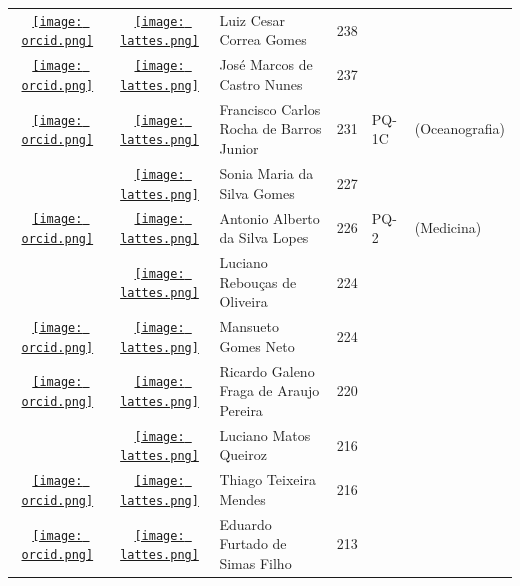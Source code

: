 \documentclass[12pt,brazil]{article}\usepackage[]{graphicx}\usepackage[]{xcolor}
\begin{document}
\begin{longtable}{cclrll}
\href{https://orcid.org/0000-0002-3171-9988}{\texttt{[image: orcid.png]}} & \href{http://lattes.cnpq.br/9902635897527204}{\texttt{[image: lattes.png]}} & Luiz Cesar Correa Gomes & 238 &  &  \\

\href{https://orcid.org/0000-0001-7142-5995}{\texttt{[image: orcid.png]}} & \href{http://lattes.cnpq.br/5553350296562020}{\texttt{[image: lattes.png]}} & José Marcos de Castro Nunes & 237 &  &  \\

\href{https://orcid.org/0000-0002-3037-1991}{\texttt{[image: orcid.png]}} & \href{http://lattes.cnpq.br/1085274416109765}{\texttt{[image: lattes.png]}} & Francisco Carlos Rocha de Barros Junior & 231 & PQ-1C & (Oceanografia) \\

 & \href{http://lattes.cnpq.br/3105186524832213}{\texttt{[image: lattes.png]}} & Sonia Maria da Silva Gomes & 227 &  &  \\

\href{https://orcid.org/0000-0002-7875-8212}{\texttt{[image: orcid.png]}} & \href{http://lattes.cnpq.br/4683004949201653}{\texttt{[image: lattes.png]}} & Antonio Alberto da Silva Lopes & 226 & PQ-2 & (Medicina) \\

 & \href{http://lattes.cnpq.br/0372650483087124}{\texttt{[image: lattes.png]}} & Luciano Rebouças de Oliveira & 224 &  &  \\

\href{https://orcid.org/0000-0002-0717-9694}{\texttt{[image: orcid.png]}} & \href{http://lattes.cnpq.br/1725940502832756}{\texttt{[image: lattes.png]}} & Mansueto Gomes Neto & 224 &  &  \\

\href{https://orcid.org/0000-0003-3913-3735}{\texttt{[image: orcid.png]}} & \href{http://lattes.cnpq.br/1786940828895467}{\texttt{[image: lattes.png]}} & Ricardo Galeno Fraga de Araujo Pereira & 220 &  &  \\

 & \href{http://lattes.cnpq.br/3016420113023123}{\texttt{[image: lattes.png]}} & Luciano Matos Queiroz & 216 &  &  \\

\href{https://orcid.org/0000-0003-1644-4020}{\texttt{[image: orcid.png]}} & \href{http://lattes.cnpq.br/1989081286274816}{\texttt{[image: lattes.png]}} & Thiago Teixeira Mendes & 216 &  &  \\

\href{https://orcid.org/0000-0001-8707-785X}{\texttt{[image: orcid.png]}} & \href{http://lattes.cnpq.br/6012321412801915}{\texttt{[image: lattes.png]}} & Eduardo Furtado de Simas Filho & 213 &  &  \\


\end{longtable}
\end{document}
